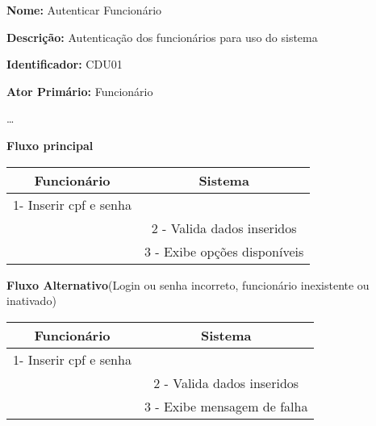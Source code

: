 	\par
	\textbf{Nome:} Autenticar Funcionário 
	\par
	\textbf{Descrição:} Autenticação dos funcionários para uso do sistema
	\par 
	\textbf{Identificador:} CDU01
	\par
	\textbf{Ator Primário:} Funcionário	
	\par
	\ldots
	\par
	\textbf{Fluxo principal}\par
	\begin{tabular}{|c|c|}
		\hline 
		Funcionário & Sistema \\ 
		\hline 
		1- Inserir cpf e senha  &  \\ 
		\hline 
		& 
		
		2 - Valida dados inseridos 
		\\ 
		\hline 
		& 
		
		3 - Exibe opções disponíveis
		\\ 
		\hline 
	\end{tabular} 
	\vspace{12px}
	\par
	\textbf{Fluxo Alternativo}(Login ou senha incorreto, funcionário inexistente ou inativado)\par
	\begin{tabular}{|c|c|}
		\hline 
		Funcionário & Sistema \\ 
		\hline 
		1- Inserir cpf e senha  &  \\ 
		\hline 
		& 
		
		2 - Valida dados inseridos 
		\\ 
		\hline 
		& 
				
		3 - Exibe mensagem de falha		
		\\ 
		\hline 
	\end{tabular} 
	\vspace{12px}

